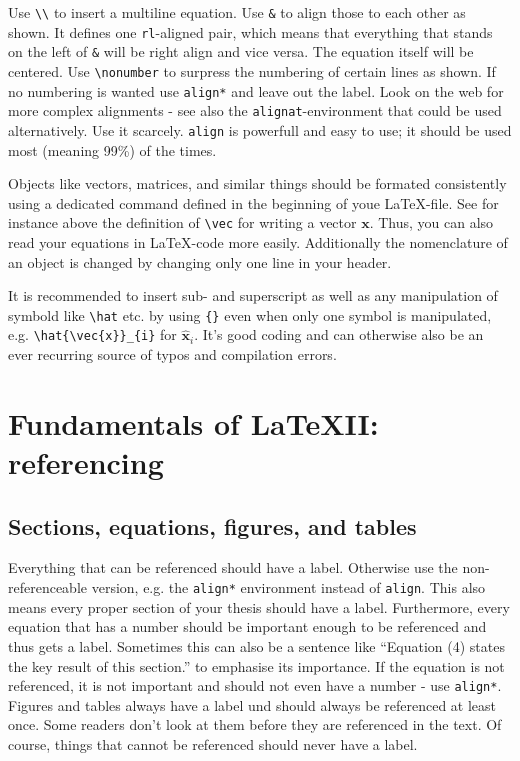\documentclass[12pt,a4paper]{article}
\makeatletter
\renewcommand{\vec}[1]{\boldsymbol{#1}}         %
\renewcommand{\cleardoublepage}{\clearpage\if@twoside \ifodd\c@page\else
  \hbox{}
  \vspace*{\fill}
  \thispagestyle{empty}
  \newpage
  \if@twocolumn\hbox{}\newpage\fi\fi\fi}
\makeatother
\begin{document}
Use \verb!\\! to insert a multiline equation. Use \verb!&! to align those 
to each other as shown. It defines one \verb!rl!-aligned pair, which means that
everything that stands on the left of \verb!&! will be right align and vice
versa.  The equation itself will be centered. Use \verb!\nonumber! to surpress
the numbering of certain lines as shown. If no numbering is wanted use
\verb!align*! and leave out the label. Look on the web for more complex
alignments - see also the \verb!alignat!-environment that could be used
alternatively. Use it scarcely. \verb!align! is powerfull and easy to use; it
should be used most (meaning 99\%) of the times.

Objects like vectors, matrices, and similar things should be formated
consistently using a dedicated command defined in the beginning of youe
\LaTeX-file. See for instance above the definition of \verb!\vec! for writing
a vector $\vec{x}$. Thus, you can also read your equations in \LaTeX-code more
easily. Additionally the nomenclature of an object is changed by
changing only one line in your header. 

It is recommended to insert sub- and superscript as well as any manipulation of
symbold like \verb!\hat! etc. by using \verb!{}! even when only one symbol is
manipulated, e.g. \verb!\hat{\vec{x}}_{i}! for $\hat{\vec{x}}_{i}$. It's good
coding and can otherwise also be an ever recurring source of typos and
compilation errors.


\cleardoublepage
\section{Fundamentals of \LaTeX II: referencing}\label{sec:referencing}

\subsection{Sections, equations, figures, and tables}
\label{sec:refseceq}

Everything that can be referenced should have a label. Otherwise use the
non-referenceable version, e.g. the \verb!align*! environment instead of
\verb!align!. This also means every proper section of your thesis should have a
label. Furthermore, every equation that has a number should be important
enough to be referenced and thus gets a label. Sometimes this can also be a
sentence like ``Equation (4) states the key result of this section.'' to
emphasise its importance. If the equation is not referenced, it is not
important and should not even have a number - use \verb!align*!. Figures and
tables always have a label und should always be referenced at least
once. Some readers don't look at them before they are referenced in the
text. Of course, things that cannot be referenced should
never have a label. 
\end{document}
